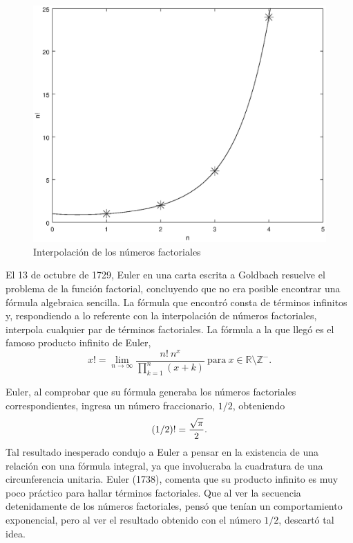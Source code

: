 \begin{figure}[htbp]
	\begin{center}
		\includegraphics[scale=0.5]{figura1_4.eps}
	\end{center}
\caption{Interpolación de los números factoriales}
\label{fig1_4}
\end{figure}

El 13 de octubre de 1729, Euler en una carta escrita a Goldbach resuelve el problema de la función factorial, concluyendo que no era posible encontrar una fórmula algebraica sencilla. La fórmula que encontró consta de términos infinitos y, respondiendo a lo referente con la interpolación de números factoriales, interpola cualquier par de términos factoriales. La fórmula a la que llegó es el famoso producto infinito de Euler, 
\begin{equation}
	x! = \lim\limits_{n\rightarrow\infty} \frac{n!\ n^x}{\prod_{k=1}^{n}(x+k)}\ \textrm{para}\ x\in \mathbb{R}\texttt{\textbackslash}\mathbb{Z}^-.
\end{equation}

Euler, al comprobar que su fórmula generaba los números factoriales correspondientes, ingresa un número fraccionario, $1/2$, obteniendo $$(1/2)! = {\sqrt{\pi} \over 2}.$$ Tal resultado inesperado condujo a Euler a pensar en la existencia de una relación con una fórmula integral, ya que involucraba la cuadratura de una circunferencia unitaria. Euler (1738), comenta que su producto infinito es muy poco práctico para hallar términos factoriales. Que al ver la secuencia detenidamente de los números factoriales, pensó que tenían un comportamiento exponencial, pero al ver el resultado obtenido con el número $1/2$, descartó tal idea.

